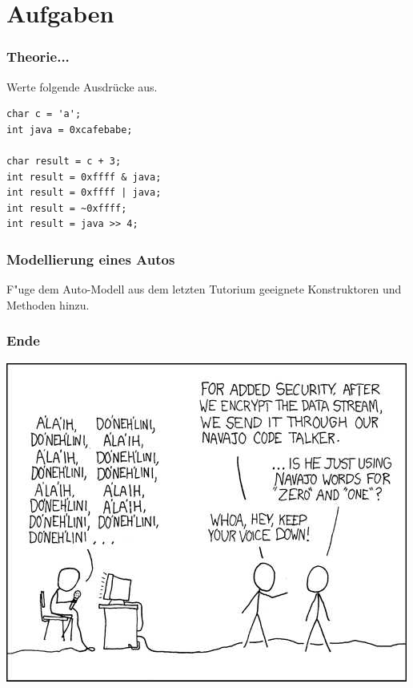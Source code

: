 \documentclass{beamer}
\begin{document}
\section{Aufgaben}
\begin{frame}[fragile]
\frametitle{Theorie...}
Werte folgende Ausdr\"{u}cke aus.
\begin{verbatim}
char c = 'a';
int java = 0xcafebabe;

char result = c + 3;
int result = 0xffff & java;
int result = 0xffff | java;
int result = ~0xffff;
int result = java >> 4;
\end{verbatim}
\end{frame}

\begin{frame}
\frametitle{Modellierung eines Autos}
F"uge dem Auto-Modell aus dem letzten Tutorium geeignete Konstruktoren und Methoden hinzu.
\end{frame}

\begin{frame}
\frametitle{Ende}
\includegraphics[scale=0.4]{code_talkers.jpg}
\end{frame}
\end{document}
